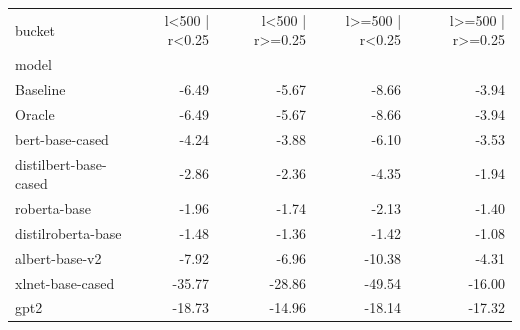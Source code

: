 \begin{tabular}{lrrrr}
\toprule
bucket & l<500 | r<0.25 & l<500 | r>=0.25 & l>=500 | r<0.25 & l>=500 | r>=0.25 \\
model &  &  &  &  \\
\midrule
Baseline & -6.49 & -5.67 & -8.66 & -3.94 \\
Oracle & -6.49 & -5.67 & -8.66 & -3.94 \\
bert-base-cased & -4.24 & -3.88 & -6.10 & -3.53 \\
distilbert-base-cased & -2.86 & -2.36 & -4.35 & -1.94 \\
roberta-base & -1.96 & -1.74 & -2.13 & -1.40 \\
distilroberta-base & -1.48 & -1.36 & -1.42 & -1.08 \\
albert-base-v2 & -7.92 & -6.96 & -10.38 & -4.31 \\
xlnet-base-cased & -35.77 & -28.86 & -49.54 & -16.00 \\
gpt2 & -18.73 & -14.96 & -18.14 & -17.32 \\
\bottomrule
\end{tabular}
